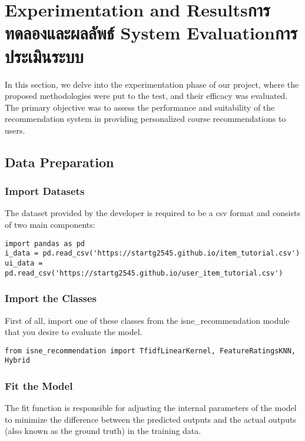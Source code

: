 \chapter{\ifproject%
\ifenglish Experimentation and Results\else การทดลองและผลลัพธ์\fi
\else%
\ifenglish System Evaluation\else การประเมินระบบ\fi
\fi}

In this section, we delve into the experimentation phase of our project, where 
the proposed methodologies were put to the test, and their efficacy was evaluated. 
The primary objective was to assess the performance and suitability of the 
recommendation system in providing personalized course recommendations to users.

\section{Data Preparation}

\subsection{Import Datasets}
The dataset provided by the developer is required to be a csv format and consists of two main components:
\begin{verbatim}
import pandas as pd
i_data = pd.read_csv('https://startg2545.github.io/item_tutorial.csv')
ui_data = pd.read_csv('https://startg2545.github.io/user_item_tutorial.csv')
\end{verbatim}

\subsection{Import the Classes}

First of all, import one of these classes from the isne\_recommendation 
module that you desire to evaluate the model.

\begin{verbatim}
from isne_recommendation import TfidfLinearKernel, FeatureRatingsKNN, Hybrid
\end{verbatim}

\subsection{Fit the Model}

The fit function is responsible for adjusting the internal parameters of the model 
to minimize the difference between the predicted outputs and the actual outputs 
(also known as the ground truth) in the training data.


